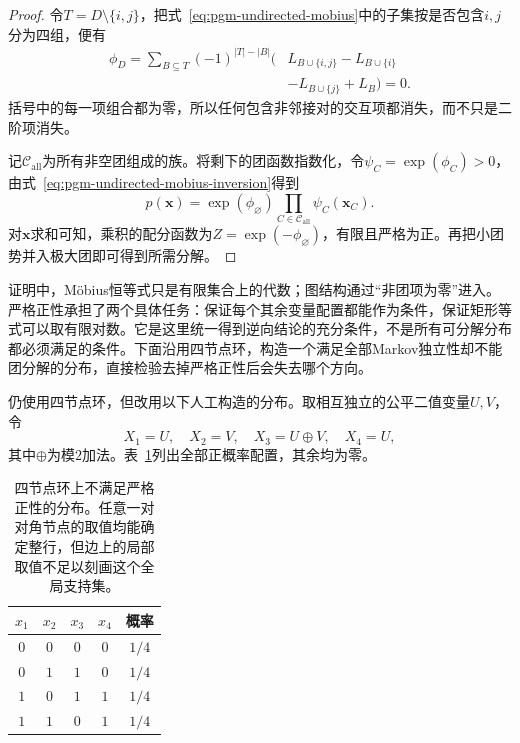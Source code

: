 \begin{proof}
令$T=D\setminus\{i,j\}$，把式~\eqref{eq:pgm-undirected-mobius}中的子集按是否包含$i,j$分为四组，便有
\begin{equation}
  \begin{aligned}
    \phi_D
    =\sum_{B\subseteq T}(-1)^{|T|-|B|}
      \bigl(&L_{B\cup\{i,j\}}-L_{B\cup\{i\}}\\
            &-L_{B\cup\{j\}}+L_B\bigr)=0.
  \end{aligned}
  \label{eq:pgm-undirected-nonclique-vanishes}
\end{equation}
括号中的每一项组合都为零，所以任何包含非邻接对的交互项都消失，而不只是二阶项消失。

记$\mathcal{C}_{\mathrm{all}}$为所有非空团组成的族。将剩下的团函数指数化，令$\psi_C=\exp(\phi_C)>0$，由式~\eqref{eq:pgm-undirected-mobius-inversion}得到
\[
  p(\bm{x})
  =\exp(\phi_{\varnothing})
     \prod_{C\in\mathcal{C}_{\mathrm{all}}}\psi_C(\bm{x}_C).
\]
对$\bm{x}$求和可知，乘积的配分函数为$Z=\exp(-\phi_{\varnothing})$，有限且严格为正。再把小团势并入极大团即可得到所需分解。
\end{proof}

证明中，Möbius恒等式只是有限集合上的代数；图结构通过“非团项为零”进入。严格正性承担了两个具体任务：保证每个其余变量配置都能作为条件，保证矩形等式可以取有限对数。它是这里统一得到逆向结论的充分条件，不是所有可分解分布都必须满足的条件。下面沿用四节点环，构造一个满足全部Markov独立性却不能团分解的分布，直接检验去掉严格正性后会失去哪个方向。

\begin{example}[满足全局Markov性质却不能团分解]
  \label{ex:pgm-undirected-zero-support}
  仍使用四节点环，但改用以下人工构造的分布。取相互独立的公平二值变量$U,V$，令
  \[
    X_1=U,\quad X_2=V,\quad
    X_3=U\mathbin{\oplus}V,\quad X_4=U,
  \]
  其中$\oplus$为模$2$加法。表~\ref{tab:pgm-undirected-zero-support}列出全部正概率配置，其余均为零。
\end{example}

\begin{table}[htbp]
  \centering
  \begin{tabular}{ccccc}
    \toprule
    $x_1$ & $x_2$ & $x_3$ & $x_4$ & 概率 \\
    \midrule
    $0$ & $0$ & $0$ & $0$ & $1/4$ \\
    $0$ & $1$ & $1$ & $0$ & $1/4$ \\
    $1$ & $0$ & $1$ & $1$ & $1/4$ \\
    $1$ & $1$ & $0$ & $1$ & $1/4$ \\
    \bottomrule
  \end{tabular}
  \caption{四节点环上不满足严格正性的分布。任意一对对角节点的取值均能确定整行，但边上的局部取值不足以刻画这个全局支持集。}
  \label{tab:pgm-undirected-zero-support}
\end{table}

